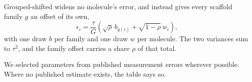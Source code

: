 Grouped-shifted widens no molecule's error, and instead gives every scaffold family $g$ an offset of
its own,
\begin{equation}
\epsilon_i = \frac{\tau}{G}\left(\sqrt{\rho}\,b_{g(i)} + \sqrt{1-\rho}\,w_i\right),
\label{eq:grouped_shifted}
\end{equation}
with one draw $b$ per family and one draw $w$ per molecule. The two variances sum to $\tau^{2}$, and
the family offset carries a share $\rho$ of that total.

We selected parameters from published measurement errors wherever possible. Where no published estimate exists, the table says so.

